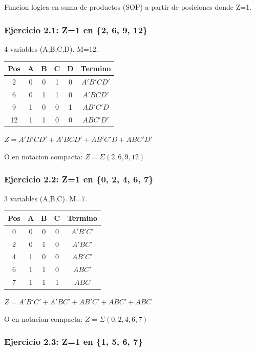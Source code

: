 \documentclass[12pt,a4paper]{article}
\begin{document}
Funcion logica en suma de productos (SOP) a partir de posiciones donde Z=1.

\subsubsection{Ejercicio 2.1: Z=1 en \{2, 6, 9, 12\}}

4 variables (A,B,C,D). M=12.

\begin{center}
\begin{tabular}{|c|c|c|c|c|c|}
\hline
Pos & A & B & C & D & Termino \\
\hline
2 & 0 & 0 & 1 & 0 & $A'B'CD'$ \\
6 & 0 & 1 & 1 & 0 & $A'BCD'$ \\
9 & 1 & 0 & 0 & 1 & $AB'C'D$ \\
12 & 1 & 1 & 0 & 0 & $ABC'D'$ \\
\hline
\end{tabular}
\end{center}

$Z = A'B'CD' + A'BCD' + AB'C'D + ABC'D'$

O en notacion compacta: $Z = \Sigma(2,6,9,12)$

\subsubsection{Ejercicio 2.2: Z=1 en \{0, 2, 4, 6, 7\}}

3 variables (A,B,C). M=7.

\begin{center}
\begin{tabular}{|c|c|c|c|c|}
\hline
Pos & A & B & C & Termino \\
\hline
0 & 0 & 0 & 0 & $A'B'C'$ \\
2 & 0 & 1 & 0 & $A'BC'$ \\
4 & 1 & 0 & 0 & $AB'C'$ \\
6 & 1 & 1 & 0 & $ABC'$ \\
7 & 1 & 1 & 1 & $ABC$ \\
\hline
\end{tabular}
\end{center}

$Z = A'B'C' + A'BC' + AB'C' + ABC' + ABC$

O en notacion compacta: $Z = \Sigma(0,2,4,6,7)$

\subsubsection{Ejercicio 2.3: Z=1 en \{1, 5, 6, 7\}}
\end{document}
